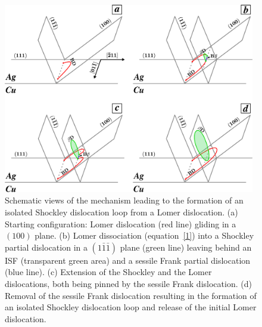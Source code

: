 \documentclass[final,3p,times,twocolumn]{elsarticle}
\begin{document}
\begin{figure}[!t]
	\begin{center}
		\includegraphics[width=110mm]{Pic/fig_lomdisso.eps} 
	\end{center}
	\caption{Schematic views of the mechanism leading to the formation of an isolated Shockley dislocation loop from a Lomer dislocation. (a) Starting configuration: Lomer dislocation (red line) gliding in a $(100)$ plane. (b) Lomer dissociation (equation~\ref{1}) into a Shockley partial dislocation in a $(1\bar{1}\bar{1})$ plane (green line) leaving behind an ISF (transparent green area) and a sessile Frank partial dislocation (blue line). (c) Extension of the Shockley and the Lomer dislocations, both being pinned by the sessile Frank dislocation. (d) Removal of the sessile Frank dislocation resulting in the formation of an isolated Shockley dislocation loop and release of the initial Lomer dislocation.}\label{fig_Lomer}
\end{figure} 
\end{document}
